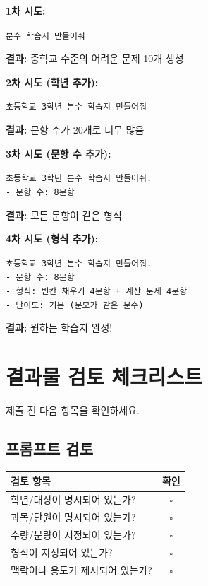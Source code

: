 \documentclass[11pt,a4paper]{article}
\begin{document}
\begin{infobox}

\textbf{1차 시도:}
\begin{codebox}
\texttt{분수 학습지 만들어줘}
\end{codebox}
\textbf{결과:} 중학교 수준의 어려운 문제 10개 생성

\textbf{2차 시도 (학년 추가):}
\begin{codebox}
\texttt{초등학교 3학년 분수 학습지 만들어줘}
\end{codebox}
\textbf{결과:} 문항 수가 20개로 너무 많음

\textbf{3차 시도 (문항 수 추가):}
\begin{codebox}
\texttt{초등학교 3학년 분수 학습지 만들어줘.}\\
\texttt{- 문항 수: 8문항}
\end{codebox}
\textbf{결과:} 모든 문항이 같은 형식

\textbf{4차 시도 (형식 추가):}
\begin{codebox}
\texttt{초등학교 3학년 분수 학습지 만들어줘.}\\
\texttt{- 문항 수: 8문항}\\
\texttt{- 형식: 빈칸 채우기 4문항 + 계산 문제 4문항}\\
\texttt{- 난이도: 기본 (분모가 같은 분수)}
\end{codebox}
\textbf{결과:} 원하는 학습지 완성!
\end{infobox}

\newpage

\section{결과물 검토 체크리스트}

제출 전 다음 항목을 확인하세요.

\subsection{프롬프트 검토}

\begin{center}
\begin{tabular}{|l|c|}
\hline
\rowcolor{lightblue}
\textbf{검토 항목} & \textbf{확인} \\
\hline
학년/대상이 명시되어 있는가? & $\square$ \\
\hline
과목/단원이 명시되어 있는가? & $\square$ \\
\hline
수량/분량이 지정되어 있는가? & $\square$ \\
\hline
형식이 지정되어 있는가? & $\square$ \\
\hline
맥락이나 용도가 제시되어 있는가? & $\square$ \\
\hline
\end{tabular}
\end{center}
\end{document}
